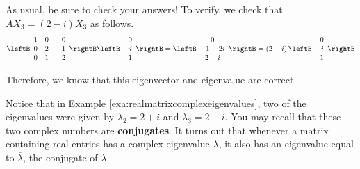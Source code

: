 \begin{solution}
As usual, be sure to check your answers! To verify, we check that 
$AX_3 = \left(2 - i \right) X_3$ as follows.
\begin{equation*}
\leftB
\begin{array}{rrr}
1 & 0 &  0 \\
0 & 2 & -1 \\
0 & 1 &  2
\end{array}
\rightB \leftB
\begin{array}{r}
0 \\
-i \\
1
\end{array}
\rightB = \leftB
\begin{array}{c}
0 \\
-1-2i \\
2-i
\end{array}
\rightB =\left( 2-i\right) \leftB
\begin{array}{r}
0 \\
-i \\
1
\end{array}
\rightB
\end{equation*}

Therefore, we know that this eigenvector and eigenvalue are correct. 
\end{solution}

Notice that in Example \ref{exa:realmatrixcomplexeigenvalues}, two of the eigenvalues were given by 
$\lambda_2 = 2 + i$ and $\lambda_3 = 2-i$. You may recall that these two complex numbers are \textbf{conjugates}. 
It turns out that whenever a matrix containing real entries has a complex eigenvalue $\lambda$, it also has an eigenvalue
equal to $\overline{\lambda}$, the conjugate of $\lambda$. 